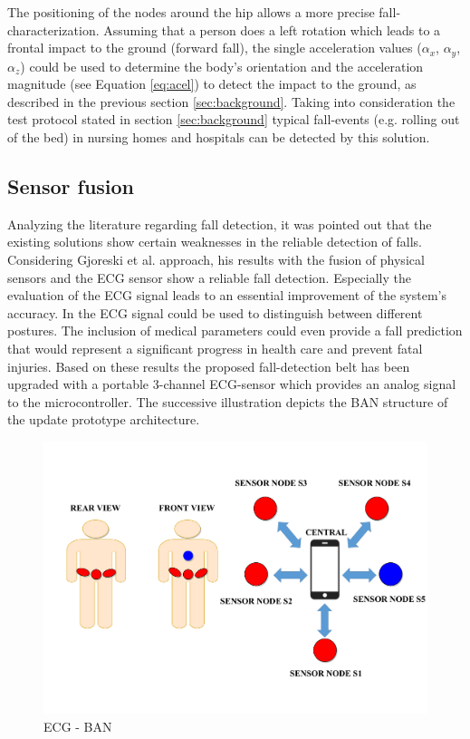 \documentclass[review]{elsarticle}
\begin{document}
The positioning of the nodes around the hip allows a more precise fall-characterization. Assuming that a person does a left rotation which leads to a frontal impact to the ground (forward fall), the single acceleration values ($\alpha_x$,  $\alpha_y$,  $\alpha_z$) could be used to determine the body's orientation and the acceleration magnitude (see Equation \ref*{eq:acel}) to detect the impact to the ground, as described in the previous section \ref{sec:background}. Taking into consideration the test protocol stated in section \ref{sec:background} typical fall-events (e.g. rolling out of the bed) in nursing homes and hospitals can be detected by this solution.


\subsection{Sensor fusion}
\label{subsec:sensorfusion}	
Analyzing the literature regarding fall detection, it was pointed out that the existing solutions show certain weaknesses in the reliable detection of falls. Considering Gjoreski et al. approach, his results with the fusion of physical sensors and the ECG sensor show a reliable fall detection. Especially the evaluation of the ECG signal leads to an essential improvement of the system's accuracy.  In \cite{Gjoreski2014} the ECG signal could be used to distinguish between different postures. The inclusion of medical parameters could even provide a fall prediction that would represent a significant progress in health care and prevent fatal injuries. Based on these results the proposed fall-detection belt  has been upgraded with a portable 3-channel ECG-sensor which provides an analog signal to the microcontroller. The successive illustration depicts the BAN structure of the update prototype architecture.
\begin{figure}[!ht]
	\centering
	\includegraphics[scale=0.34]{images/ECG-BAN}
	\caption[ECG - BAN]{ECG - BAN}
	\label{fig:ECGBAN}
\end{figure}
\end{document}

